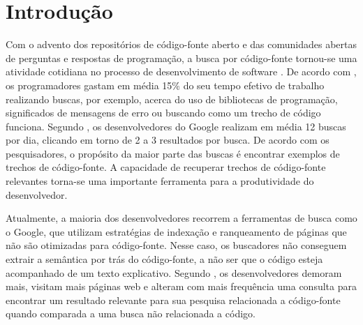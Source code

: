 \chapter{Introdução}
\label{cap:introducao}


Com o advento dos repositórios de código-fonte aberto e das comunidades abertas de perguntas e respostas de programação, a busca por código-fonte tornou-se uma atividade cotidiana no processo de desenvolvimento de software \cite{towards-summarizing-source-code-search:marin:2020}. De acordo com , os programadores gastam em média 15\% do seu tempo efetivo de trabalho realizando buscas, por exemplo, acerca do uso de bibliotecas de programação, significados de mensagens de erro ou buscando como um trecho de código funciona. Segundo , os desenvolvedores do Google realizam em média 12 buscas por dia, clicando em torno de 2 a 3 resultados por busca. De acordo com os pesquisadores, o propósito da maior parte das buscas é encontrar exemplos de trechos de código-fonte. A capacidade de recuperar trechos de código-fonte relevantes torna-se uma importante ferramenta para a produtividade do desenvolvedor. 

Atualmente, a maioria dos desenvolvedores recorrem a ferramentas de busca como o Google, que utilizam estratégias de indexação e ranqueamento de páginas que não são otimizadas para código-fonte. Nesse caso, os buscadores não conseguem extrair a semântica por trás do código-fonte, a não ser que o código esteja acompanhado de um texto explicativo. Segundo , os desenvolvedores demoram mais, visitam mais páginas web e alteram com mais frequência uma consulta para encontrar um resultado relevante para sua pesquisa relacionada a código-fonte quando comparada a uma busca não relacionada a código.

